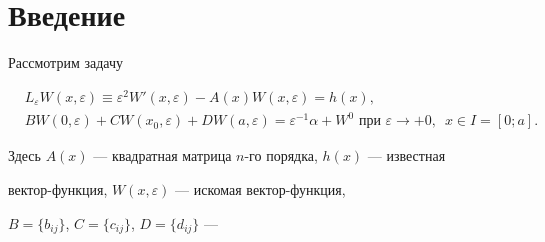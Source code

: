  


\date{} 




 


\pagestyle{plain} %


 


 




 


\maketitle 


\label{begin} 


 


 


\section*{Введение} 


 


Рассмотрим задачу 


\begin{equation} 


\begin{split} 


&L_\varepsilon W(x,\varepsilon)\equiv\varepsilon^2 


W'(x,\varepsilon)-A(x)W(x,\varepsilon)=h(x),\\ 


& BW(0,\varepsilon)+CW(x_0,\varepsilon)+DW(a,\varepsilon)= 


\varepsilon^{-1}\alpha+W^0 


\text{ при }\varepsilon\to+0,\ \; x\in I=[0;a]. 


\end{split} 


\tag{1} 


\end{equation} 


Здесь $A(x)$ --- квадратная матрица $n$-го порядка, $h(x)$ --- известная  


вектор-функция, $W(x,\varepsilon)$ --- искомая вектор-функция, 


$B=\{b_{ij}\}$, $C=\{c_{ij}\}$, $D=\{d_{ij}\}$ --- 


